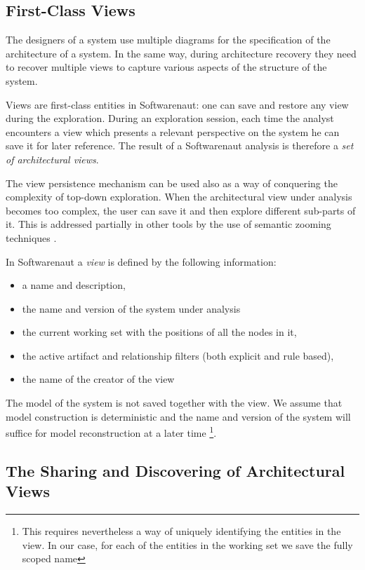 \documentclass[preprint,12pt]{elsarticle}
\begin{document}
\subsection {First-Class Views}

The designers of a system use multiple diagrams for the specification of the architecture of a system. In the same way, during architecture recovery they need to recover multiple views to capture various aspects of the structure of the system. 

Views are first-class entities in Softwarenaut: one can save and restore any view during the exploration. During an exploration session, each time the analyst encounters a view which presents a relevant perspective on the system he can save it for later reference. The result of a Softwarenaut analysis is therefore a {\em set of architectural views}.

The view persistence mechanism can be used also as a way of conquering the complexity of top-down exploration. When the architectural view under analysis becomes too complex, the user can save it and then explore different sub-parts of it. This is addressed partially in other tools by the use of semantic zooming techniques \cite{storey-shrimp}. 

In Softwarenaut a {\em view} is defined by the following information: 

\begin{itemize}
\item a name and description,
\item the name and version of the system under analysis
\item the current working set with the positions of all the nodes in it,
\item the active artifact and relationship filters (both explicit and rule based), 
\item the name of the creator of the view
\end{itemize}

The model of the system is not saved together with the view. We assume that model construction is deterministic and the name and version of the system will suffice for model reconstruction at a later time \footnote{This requires nevertheless a way of uniquely identifying the entities in the view. In our case, for each of the entities in the working set we save the fully scoped name}.

\subsection {The Sharing and Discovering of Architectural Views}
\end{document}
